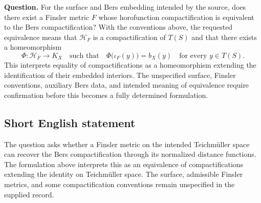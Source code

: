\documentclass[11pt]{article}
\begin{document}
\textbf{Question.} For the surface and Bers embedding intended by the source, does there exist a Finsler metric \(F\) whose horofunction compactification is equivalent to the Bers compactification? With the conventions above, the requested equivalence means that \(\mathcal H_F\) is a compactification of \(T(S)\) and that there exists a homeomorphism
\[
 \Phi:\mathcal H_F\longrightarrow K_X
 \quad\text{such that}\quad
 \Phi\bigl(\iota_F(y)\bigr)=b_X(y)
 \quad\text{for every }y\in T(S).
\]
This interprets equality of compactifications as a homeomorphism extending the identification of their embedded interiors. The unspecified surface, Finsler conventions, auxiliary Bers data, and intended meaning of equivalence require confirmation before this becomes a fully determined formulation.
\subsection{Short English statement}
The question asks whether a Finsler metric on the intended Teichmüller space can recover the Bers compactification through its normalized distance functions. The formulation above interprets this as an equivalence of compactifications extending the identity on Teichmüller space. The surface, admissible Finsler metrics, and some compactification conventions remain unspecified in the supplied record.
\end{document}
